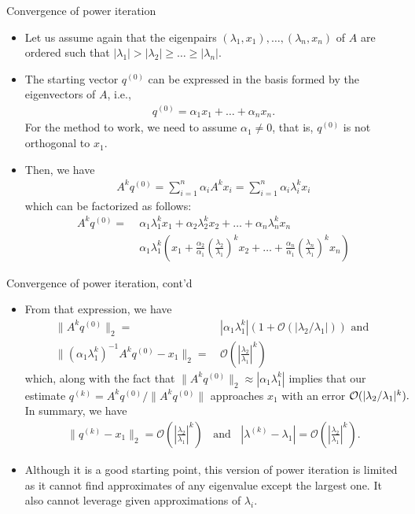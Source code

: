 \documentclass[t,usepdftitle=false]{beamer}
\begin{document}
\begin{frame}{Convergence of power iteration}
\begin{itemize}
\item Let us assume again that the eigenpairs $(\lambda_1,x_1),\dots,(\lambda_n,x_n)$ of $A$ are ordered such that $|\lambda_1|>|\lambda_2|\geq\dots\geq|\lambda_n|$.
\item The starting vector $q^{(0)}$ can be expressed in the basis formed by the eigenvectors of $A$, i.e.,
\begin{align*}
q^{(0)}=\alpha_1x_1+\dots+\alpha_nx_n.
\end{align*}
For the method to work, we need to assume $\alpha_1\neq 0$, that is, $q^{(0)}$ is not orthogonal to $x_1$.
\item Then, we have
\begin{align*}
A^kq^{(0)}=\sum_{i=1}^n\alpha_iA^kx_i=\sum_{i=1}^n\alpha_i\lambda_i^kx_i
\end{align*}
which can be factorized as follows:
\begin{align*}
A^kq^{(0)}=
&\;\alpha_1\lambda_1^kx_1+\alpha_2\lambda_2^kx_2+\dots+\alpha_n\lambda_n^kx_n\\
&\;\alpha_1\lambda_1^k\left(x_1+\frac{\alpha_2}{\alpha_1}\left(\frac{\lambda_2}{\lambda_1}\right)^kx_2+\dots+\frac{\alpha_n}{\alpha_1}\left(\frac{\lambda_n}{\lambda_1}\right)^kx_n\right)
\end{align*}
\end{itemize}
\end{frame}

\begin{frame}{Convergence of power iteration, cont'd}
\begin{itemize}
\item[] From that expression, we have
\begin{align*}
\|A^kq^{(0)}\|_2=&\,|\alpha_1\lambda_1^k|(1+\mathcal{O}(|\lambda_2/\lambda_1|))
\text{  and  }\\
\|(\alpha_1\lambda_1^k)^{-1}A^kq^{(0)}-x_1\|_2=&\,\mathcal{O}\left(\left|\frac{\lambda_2}{\lambda_1}\right|^k\right)
\end{align*}
which, along with the fact that $\|A^kq^{(0)}\|_2\approx|\alpha_1\lambda_1^k|$ implies that our estimate $q^{(k)}=A^kq^{(0)}/\|A^kq^{(0)}\|$ approaches $x_1$ with an error $\mathcal{O}(|\lambda_2/\lambda_1|^k).\hspace{-1cm}$\vspace{.1cm}\\
In summary, we have
\begin{align*}
\|q^{(k)}-x_1\|_2=\mathcal{O}\left(\left|\frac{\lambda_2}{\lambda_1}\right|^k\right)
\;\;\text{ and }\;\;   
|\lambda^{(k)}-\lambda_1|=\mathcal{O}\left(\left|\frac{\lambda_2}{\lambda_1}\right|^k\right).
\end{align*}
\item Although it is a good starting point, this version of power iteration is limited as it cannot find approximates of any eigenvalue except the largest one.
It also cannot leverage given approximations of $\lambda_i$.
\end{itemize}
\end{frame}
\end{document}
